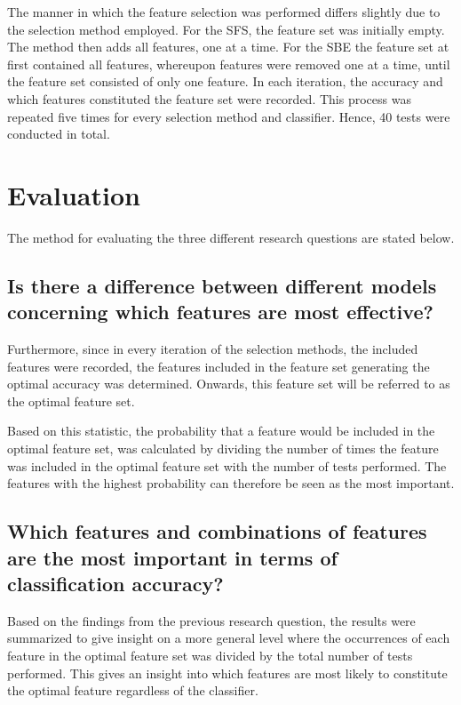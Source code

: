 \documentclass{kththesis}
\begin{document}
The manner in which the feature  selection was performed differs slightly due to the selection method employed. For the SFS, the feature set was initially empty. The method then adds all features, one at a time. For the SBE the feature set at first contained all features, whereupon features were removed one at a time, until the feature set consisted of only one feature. In each iteration, the accuracy and which features constituted the feature set were recorded. 
This process was repeated five times for every selection method and classifier. Hence, 40 tests were conducted in total.

\section{Evaluation}

The method for evaluating the three different research questions are stated below.

\subsection{Is there a difference between different models concerning which features are most effective?}
Furthermore, since in every iteration of the selection methods, the included features were recorded, the features included in the feature set generating the optimal accuracy was determined. Onwards, this feature set will be referred to as the optimal feature set. 

Based on this statistic, the probability that a feature would be included in the optimal feature set, was calculated by dividing the number of times the feature was included in the optimal feature set with the number of tests performed. The features with the highest probability can therefore be seen as the most important.

\subsection{Which features and combinations of features are the most important in terms of classification accuracy?}
Based on the findings from the previous research question, the results were summarized to give insight on a more general level where the occurrences of each feature in the optimal feature set was divided by the total number of tests performed. This gives an insight into which features are most likely to constitute the optimal feature regardless of the classifier.
\end{document}
